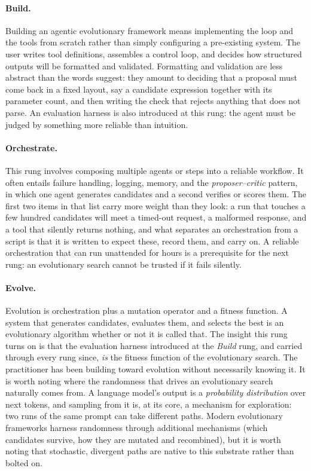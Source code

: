\paragraph{Build.}
Building an agentic evolutionary framework  means implementing the loop and the tools from scratch rather than simply configuring a pre-existing system.
The user writes tool definitions, assembles a control loop, and decides how structured outputs will be formatted and validated.
Formatting and validation are less abstract than the words suggest: they amount to deciding that a proposal must come back in a fixed layout, say a candidate expression together with its parameter count, and then writing the check that rejects anything that does not parse.
An evaluation harness is also introduced at this rung: the agent must be judged by something more reliable than intuition.

\paragraph{Orchestrate.}
This rung involves composing multiple agents or steps into a reliable workflow.
It often entails failure handling, logging, memory, and the \emph{proposer–critic} pattern, in which one agent generates candidates and a second verifies or scores them.
The first two items in that list carry more weight than they look: a run that touches a few hundred candidates will meet a timed-out request, a malformed response, and a tool that silently returns nothing, and what separates an orchestration from a script is that it is written to expect these, record them, and carry on.
A reliable orchestration that can run unattended for hours is a prerequisite for the next rung: an evolutionary search cannot be trusted if it fails silently.

\paragraph{Evolve.}
Evolution is orchestration plus a mutation operator and a fitness function.
A system that generates candidates, evaluates them, and selects the best is an evolutionary algorithm whether or not it is called that.
The insight this rung turns on is that the evaluation harness introduced at the \emph{Build} rung, and carried through every rung since, \emph{is} the fitness function of the evolutionary search.
The practitioner has been building toward evolution without necessarily knowing it.
It is worth noting where the randomness that drives an evolutionary search naturally comes from.
A language model's output is a \emph{probability distribution} over next tokens, and sampling from it is, at its core, a mechanism for exploration: two runs of the same prompt can take different paths.
Modern evolutionary frameworks harness randomness through additional mechanisms (which candidates survive, how they are mutated and recombined), but it is worth noting that stochastic, divergent paths are native to this substrate rather than bolted on.

